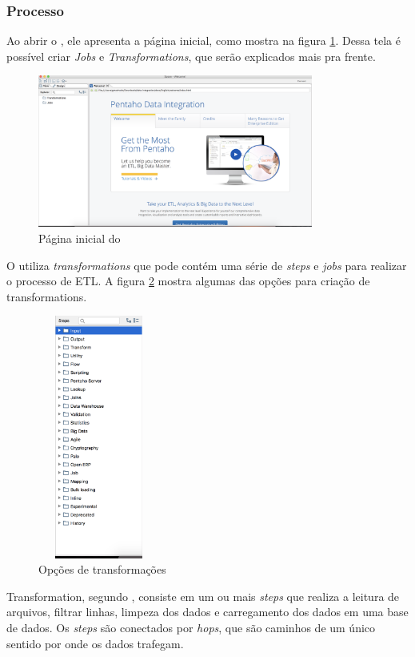 \subsubsection{Processo}
Ao abrir o \pdi, ele apresenta a página inicial, como mostra na figura \ref{initialpdi}. Dessa tela é possível criar \textit{Jobs} e \textit{Transformations}, que serão explicados mais pra frente. 
\begin{figure}[H]
\centering
\includegraphics[height=5cm]{imagens/pagina_principal_pentaho.png}
\caption{Página inicial do \pdi}
\label{initialpdi}
\end{figure}
O \pdi utiliza \textit{transformations} que pode contém uma série de \textit{steps} e \textit{jobs} para realizar o processo de ETL. A figura \ref{transformationOptions} mostra algumas das opções para criação de transformations.
\begin{figure}[H]
\centering
\includegraphics[width=4cm, height=8cm]{imagens/opcoes_de_transformacao.png}
\caption{Opções de transformações}
\label{transformationOptions}

\end{figure}
Transformation, segundo , consiste em um ou mais \textit{steps} que realiza a leitura de arquivos, filtrar linhas, limpeza dos dados e carregamento dos dados em uma base de dados. Os \textit{steps} são conectados por \textit{hops}, que são caminhos de um único sentido por onde os dados trafegam. 

